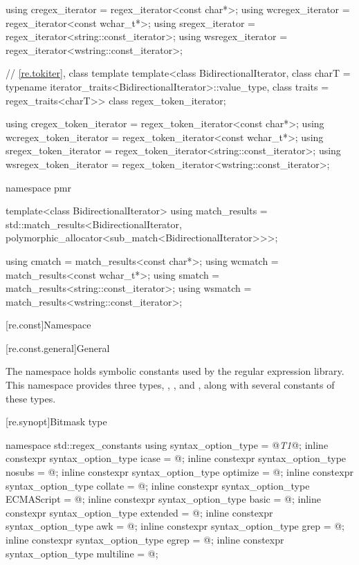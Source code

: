 \begin{codeblock}
{  using cregex_iterator  = regex_iterator<const char*>;
  using wcregex_iterator = regex_iterator<const wchar_t*>;
  using sregex_iterator  = regex_iterator<string::const_iterator>;
  using wsregex_iterator = regex_iterator<wstring::const_iterator>;

  // \ref{re.tokiter}, class template 
  template<class BidirectionalIterator,
           class charT = typename iterator_traits<BidirectionalIterator>::value_type,
           class traits = regex_traits<charT>>
    class regex_token_iterator;

  using cregex_token_iterator  = regex_token_iterator<const char*>;
  using wcregex_token_iterator = regex_token_iterator<const wchar_t*>;
  using sregex_token_iterator  = regex_token_iterator<string::const_iterator>;
  using wsregex_token_iterator = regex_token_iterator<wstring::const_iterator>;

  namespace pmr {
    template<class BidirectionalIterator>
      using match_results =
        std::match_results<BidirectionalIterator,
                           polymorphic_allocator<sub_match<BidirectionalIterator>>>;

    using cmatch  = match_results<const char*>;
    using wcmatch = match_results<const wchar_t*>;
    using smatch  = match_results<string::const_iterator>;
    using wsmatch = match_results<wstring::const_iterator>;
  }
}
\end{codeblock}

[re.const]{Namespace }

[re.const.general]{General}

\pnum
{}%
The namespace  holds
symbolic constants used by the regular expression library.  This
namespace provides three types, ,
, and , along with several
constants of these types.

[re.synopt]{Bitmask type }
%
%
\begin{codeblock}
namespace std::regex_constants {
  using syntax_option_type = @\textit{T1}@;
  inline constexpr syntax_option_type icase = @\unspec@;
  inline constexpr syntax_option_type nosubs = @\unspec@;
  inline constexpr syntax_option_type optimize = @\unspec@;
  inline constexpr syntax_option_type collate = @\unspec@;
  inline constexpr syntax_option_type ECMAScript = @\unspec@;
  inline constexpr syntax_option_type basic = @\unspec@;
  inline constexpr syntax_option_type extended = @\unspec@;
  inline constexpr syntax_option_type awk = @\unspec@;
  inline constexpr syntax_option_type grep = @\unspec@;
  inline constexpr syntax_option_type egrep = @\unspec@;
  inline constexpr syntax_option_type multiline = @\unspec@;
}
\end{codeblock}

